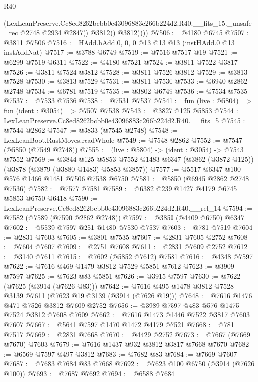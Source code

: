 \begin{lexlean}{R40}
\begin{coremodule}
                  (LexLeanPreserve.Cc8ed8262bcbb0e43096883c266b224d2.R40.__fits_15._unsafe_rec
                    @2748
                    @2934
                    @2847))
                @3812))
            @3812))))
@7506 := @4180 @6745
@7507 := @3811 @7506
@7516 := HAdd.hAdd.{0, 0, 0} @13 @13 @13 (instHAdd.{0} @13 instAddNat)
@7517 := @3788 @6749
@7519 := @7516 @7517 @19
@7521 := @6299 @7519 @6311
@7522 := @4180 @7521
@7524 := @3811 @7522 @3817
@7526 := @3811 @7524 @3812
@7528 := @3811 @7526 @3812
@7529 := @3813 @7528
@7530 := @3813 @7529
@7531 := @3811 @7530
@7533 := @6940 @2862 @2748
@7534 := @6781 @7519
@7535 := @3802 @6749
@7536 := @7534 @7535
@7537 := @7533 @7536
@7538 := @7531 @7537
@7541 := fun (live : @5804) => fun (ident : @3054) => @7507 @7538
@7543 := @3827 @125 @5853
@7544 := LexLeanPreserve.Cc8ed8262bcbb0e43096883c266b224d2.R40.__fits_5
@7545 := @7544 @2862
@7547 := @3833 (@7545 @2748)
@7548 := LexLeanBoot.RustMoves.readWhole
@7549 := @7548 @2862
@7552 := @7547 (@5850 (@7549 @2748))
@7555 := (live : @5804) -> (ident : @3054) -> @7543 @7552
@7569 := @3844
    @125
    @5853
    @7552
    @1483
    @6347
    (@3862 (@3872 @125))
    (@3878 (@3879 (@3880 @1483) @5853 @3857))
@7577 := @5517 @6347 @100 @576 @1466 @1481 @7506 @7538 @6750
@7581 := @5850 (@6945 @2862 @2748 @7536)
@7582 := @7577 @7581
@7589 := @6382 @239 @1427 @4179 @6745 @5853 @6750 @6418
@7590 := LexLeanPreserve.Cc8ed8262bcbb0e43096883c266b224d2.R40.__rel_14
@7594 := @7582 (@7589 (@7590 @2862 @2748))
@7597 := @3850 (@4409 @6750) @6347
@7602 := @5539 @7597 @251 @1480 @7530 @7537
@7603 := @781 @7519
@7604 := @2831 @7603
@7605 := @3801 @7535
@7607 := @2831 @7605 @2752
@7608 := @7604 @7607
@7609 := @2751 @7608
@7611 := @2831 @7609 @2752
@7612 := @3140 @7611
@7615 := @7602 (@5852 @7612) @7581
@7616 := @4348 @7597
@7622 := @7616 @469 @1479 @3812 @7529 @5851 @7612
@7623 := @3909 @7597
@7625 := @7623 @83 @5851
@7626 := @3915 @7597
@7630 := @7622 (@7625 (@3914 (@7626 @83)))
@7642 := @7616 @495 @1478 @3812 @7528 @3139 @7611 (@7623 @19 @3139 (@3914 (@7626 @19)))
@7648 := @7616 @1476 @471 @7526 @3812 @7609 @2752
@7656 := @3989 @7597 @483 @576 @1475 @7524 @3812 @7608 @7609
@7662 := @7616 @1473 @1446 @7522 @3817 @7603 @7607
@7667 := @5641 @7597 @1470 @1472 @4179 @7521
@7668 := @781 @7517
@7669 := @2831 @7668
@7670 := @4429 @2752
@7673 := @7667 (@7669 @7670) @7603
@7679 := @7616 @1437 @932 @3812 @3817 @7668 @7670
@7682 := @6569 @7597 @497 @3812
@7683 := @7682 @83
@7684 := @7669 @7607
@7687 := @7683 @7684 @83 @7668
@7692 := @7623 @100 @6750 (@3914 (@7626 @100))
@7693 := @7687 @7692
@7694 := @6588 @7684

\end{coremodule}
\end{lexlean}
